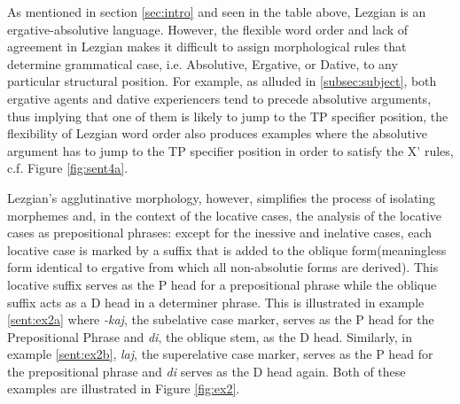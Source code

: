 As mentioned in section \ref{sec:intro} and seen in the table above, Lezgian is an ergative-absolutive language. However, the flexible word order and lack of agreement in Lezgian makes it difficult to assign morphological rules that determine grammatical case, i.e. Absolutive, Ergative, or Dative, to any particular structural position. For example, as alluded in \ref{subsec:subject}, both ergative agents and dative experiencers tend to precede absolutive arguments, thus implying that one of them is likely to jump to the TP specifier position, the flexibility of Lezgian word order also produces examples where the absolutive argument has to jump to the TP specifier position in order to satisfy the X' rules, c.f. Figure \ref{fig:sent4a}.

Lezgian's agglutinative morphology, however, simplifies the process of isolating morphemes and, in the context of the locative cases, the analysis of the locative cases as prepositional phrases: except for the inessive and inelative cases, each locative case is marked by a suffix that is added to the oblique form(meaningless form identical to ergative from which all non-absolutie forms are derived). This locative suffix serves as the P head for a prepositional phrase while the oblique suffix acts as a D head in a determiner phrase. This is illustrated in example \ref{sent:ex2a} where \textit{-kaj}, the subelative case marker, serves as the P head for the Prepositional Phrase and \textit{di}, the oblique stem, as the D head. Similarly, in example \ref{sent:ex2b}, \textit{laj}, the superelative case marker, serves as the P head for the prepositional phrase and \textit{di} serves as the D head again. Both of these examples are illustrated in Figure \ref{fig:ex2}.
